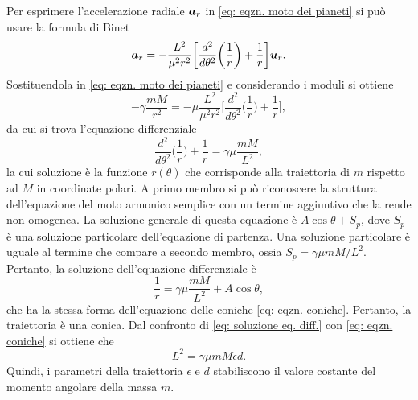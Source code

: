 Per esprimere l'accelerazione radiale $\bm{a}_r$ in \eqref{eq: eqzn. moto dei pianeti} si può usare la formula di Binet
\begin{equation}
    \bm{a}_r=-\frac{L^2}{\mu^2r^2}\bigg[\frac{d^2}{d\theta^2}\bigg(\frac{1}{r}\bigg)+\frac{1}{r}\bigg]\bm{u}_r.
\end{equation}
Sostituendola in \eqref{eq: eqzn. moto dei pianeti} e considerando i moduli si ottiene
\begin{equation}
    -\gamma\frac{mM}{r^2}=-\mu\frac{L^2}{\mu^2r^2}\bigg[\frac{d^2}{d\theta^2}\bigg(\frac{1}{r}\bigg)+\frac{1}{r}\bigg],
\end{equation}
da cui si trova l'equazione differenziale
\begin{equation}
    \frac{d^2}{d\theta^2}\bigg(\frac{1}{r}\bigg)+\frac{1}{r}=\gamma\mu\frac{mM}{L^2},
\end{equation}
la cui soluzione è la funzione $r(\theta)$ che corrisponde alla traiettoria di $m$ rispetto ad $M$ in coordinate polari. A primo membro si può riconoscere la struttura dell'equazione del moto armonico semplice con un termine aggiuntivo che la rende non omogenea. La soluzione generale di questa equazione è $A\cos\theta+S_p$, dove $S_p$ è una soluzione particolare dell'equazione di partenza. Una soluzione particolare è uguale al termine che compare a secondo membro, ossia $S_p=\gamma\mu mM/L^2$. Pertanto, la soluzione dell'equazione differenziale è
\begin{equation}
\label{eq: soluzione eq. diff.}
    \frac{1}{r}=\gamma\mu \frac{mM}{L^2}+A\cos{\theta},  
\end{equation}
che ha la stessa forma dell'equazione delle coniche \eqref{eq: eqzn. coniche}. Pertanto, la traiettoria è una conica. Dal confronto di \eqref{eq: soluzione eq. diff.} con \eqref{eq: eqzn. coniche} si ottiene che
\begin{equation}
    L^2=\gamma\mu mM\epsilon d.
\end{equation}
Quindi, i parametri della traiettoria $\epsilon$ e $d$ stabiliscono il valore costante del momento angolare della massa $m$. 

